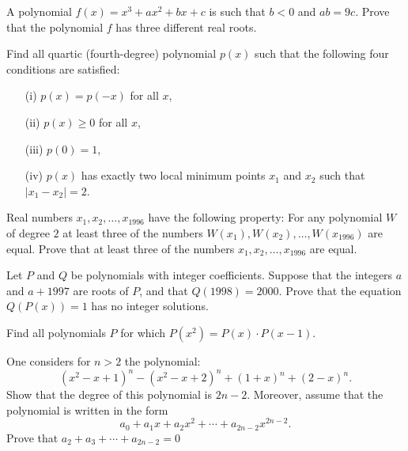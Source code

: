 \begin{question}[name={1992 Baltic Way}]
    A polynomial $f(x)=x^3+ax^2+bx+c$ is such that $b<0$ and $ab=9c$. Prove that the polynomial $f$ has three different real roots.	
\end{question}


\begin{question}[name={1992 Baltic Way}]
    Find all quartic (fourth-degree) polynomial $p(x)$ such that the following four conditions are satisfied:
    \begin{itemize}
        \item[(i)]  $p(x)=p(-x)$ for all $x$,
        \item[(ii)] $p(x)\ge0$ for all $x$,
        \item[(iii)] $p(0)=1$,
        \item[(iv)] $p(x)$ has exactly two local minimum points $x_1$ and $x_2$ such that $|x_1-x_2|=2$.
    \end{itemize}
\end{question}


\begin{question}[name={1996 Baltic Way}]
    Real numbers $x_1,x_2,\dots ,x_{1996}$ have the following property: For any polynomial $W$ of degree $2$ at least three of the numbers $W(x_1),W(x_2),\dots ,W(x_{1996})$ are equal. Prove that at least three of the numbers $x_1,x_2,\dots ,x_{1996}$ are equal.
\end{question}


\begin{question}[name={1997 Baltic Way}]
    Let $P$ and $Q$ be polynomials with integer coefficients. Suppose that the integers $a$ and $a+1997$ are roots of $P$, and that $Q(1998)=2000$. Prove that the equation $Q(P(x))=1$ has no integer solutions.	
\end{question}


\begin{question}
    Find all polynomials $P$ for which $P(x^2) = P(x) \cdot P(x-1)$.
\end{question}

\begin{question}[name={1963 Dutch Mathematical Olympiad}]
    One considers for $n > 2$ the polynomial: $$(x^2-x+1)^n - (x^2-x+2)^n+ (1+x)^n+(2-x)^n.$$ Show that the degree of this polynomial is $2n - 2$.
    Moreover, assume that the polynomial is written in the form $$a_0+a_1x+a_2x^2+\cdots +a_{2n-2}x^{2n-2}.$$ Prove that $a_2+a_3+\cdots+a_{2n-2}=0$
\end{question}

